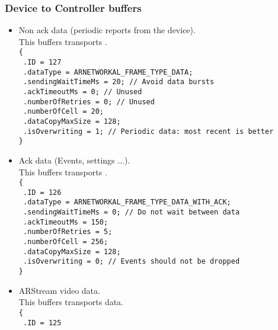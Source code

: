 \subsubsection*{Device to Controller buffers}
\begin{itemize}
\item{
    Non ack data (periodic reports from the device).\\
    This buffers transports .\\
    \texttt{\{}\\
    \texttt{  .ID = 127}\\
    \texttt{  .dataType = ARNETWORKAL\_FRAME\_TYPE\_DATA;}\\
    \texttt{  .sendingWaitTimeMs = 20; // Avoid data bursts}\\
    \texttt{  .ackTimeoutMs = 0; // Unused}\\
    \texttt{  .numberOfRetries = 0; // Unused}\\
    \texttt{  .numberOfCell = 20;}\\
    \texttt{  .dataCopyMaxSize = 128;}\\
    \texttt{  .isOverwriting = 1; // Periodic data: most recent is better}\\
    \texttt{\}}
}
\item{
    Ack data (Events, settings ...).\\
    This buffers transports .\\
    \texttt{\{}\\
    \texttt{  .ID = 126}\\
    \texttt{  .dataType = ARNETWORKAL\_FRAME\_TYPE\_DATA\_WITH\_ACK;}\\
    \texttt{  .sendingWaitTimeMs = 0; // Do not wait between data}\\
    \texttt{  .ackTimeoutMs = 150;}\\
    \texttt{  .numberOfRetries = 5;}\\
    \texttt{  .numberOfCell = 256;}\\
    \texttt{  .dataCopyMaxSize = 128;}\\
    \texttt{  .isOverwriting = 0; // Events should not be dropped}\\
    \texttt{\}}
}
\item{
    ARStream video data.\\
    This buffers transports  data.\\
    \texttt{\{}\\
    \texttt{  .ID = 125}\\
}
\end{itemize}
